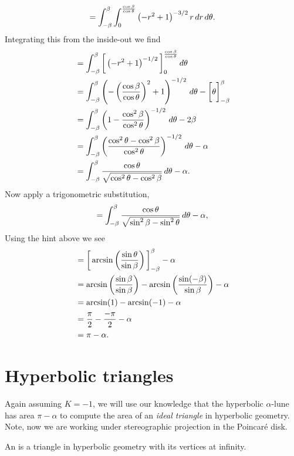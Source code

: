 \documentclass{ximera}
\begin{document}
\begin{problem}
\begin{freeResponse}
\[    = \int_{-\beta}^\beta \int_0^{\frac{\cos \beta}{\cos\theta}}\left(-r^2+1\right)^{-3/2} r\,d r\,d \theta.
    \]
    Integrating this from the inside-out we find
    \begin{align*}
      &= \int_{-\beta}^\beta \bigg[ \left(-r^2+1\right)^{-1/2} \bigg]_0^{\frac{\cos \beta}{\cos\theta}}\,d \theta\\
      &= \int_{-\beta}^\beta \left(-\left(\frac{\cos \beta}{\cos\theta}\right)^2+1\right)^{-1/2}\,d\theta - \bigg[ \theta \bigg]_{-\beta}^\beta\\
      &= \int_{-\beta}^\beta \left(1-\frac{\cos^2 \beta}{\cos^2\theta}\right)^{-1/2}\,d \theta -2\beta\\
      &= \int_{-\beta}^\beta \left(\frac{\cos^2\theta - \cos^2 \beta}{\cos^2\theta}\right)^{-1/2} \,d \theta-\alpha\\
      &= \int_{-\beta}^\beta \frac{\cos\theta}{\sqrt{\cos^2\theta - \cos^2 \beta}}\,d \theta - \alpha.
    \end{align*}
    Now apply a trigonometric substitution,
    \[
    = \int_{-\beta}^\beta \frac{\cos\theta}{\sqrt{\sin^2\beta - \sin^2 \theta}}\,d \theta- \alpha,
    \]
    Using the hint above we see
    \begin{align*}
      &= \bigg[ \arcsin\left(\frac{\sin\theta}{\sin\beta}\right) \bigg]_{-\beta}^\beta - \alpha\\
      &= \arcsin\left(\frac{\sin\beta}{\sin\beta}\right)- \arcsin\left(\frac{\sin(-\beta)}{\sin\beta}\right)- \alpha\\
      &= \arcsin(1)-\arcsin(-1)-\alpha\\
      &= \frac{\pi}{2}-\frac{-\pi}{2}-\alpha\\
      &= \pi-\alpha.
    \end{align*}
  \end{freeResponse}
\end{problem}


\section{Hyperbolic triangles}

Again assuming $K=-1$, we will use our knowledge that the hyperbolic
$\alpha$-lune has area $\pi-\alpha$ to compute the area of an
\textit{ideal triangle} in hyperbolic geometry. Note, now we are
working under stereographic projection in the Poincar\'e disk.

\begin{definition}
  An  is a triangle in hyperbolic geometry with
  its vertices at infinity.
\end{definition}
\end{document}

